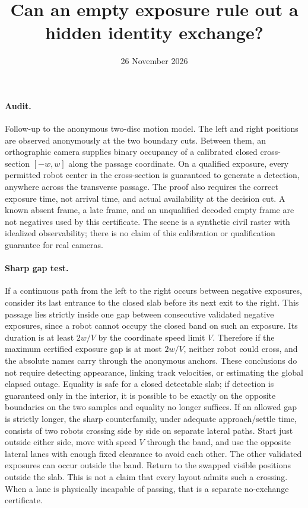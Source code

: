 \documentclass{article}
\title{Can an empty exposure rule out a hidden identity exchange?}
\author{}
\date{26 November 2026}
\begin{document}
\maketitle

\paragraph{Audit.}
Follow-up to the anonymous two-disc motion model. The left and right
positions are observed anonymously at the two boundary cuts. Between
them, an orthographic camera supplies binary occupancy of a calibrated
closed cross-section $[-w,w]$ along the passage coordinate. On a qualified
exposure, every permitted robot center in the cross-section is guaranteed
to generate a detection, anywhere across the transverse passage.
The proof also requires the correct exposure time, not arrival time,
and actual availability at the decision cut. A known absent frame,
a late frame, and an unqualified decoded empty frame are not negatives
used by this certificate. The scene is a synthetic civil raster with
idealized observability; there is no claim of this calibration or
qualification guarantee for real cameras.

\paragraph{Sharp gap test.}
If a continuous path from the left to the right occurs between negative
exposures, consider its last entrance to the closed slab before its
next exit to the right. This passage lies strictly inside one gap
between consecutive validated negative exposures, since a robot
cannot occupy the closed band on such an exposure. Its duration is
at least $2w/V$ by the coordinate speed limit $V$. Therefore if the
maximum certified exposure gap is at most $2w/V$, neither robot could
cross, and the absolute names carry through the anonymous anchors.
These conclusions do not require detecting appearance, linking track
velocities, or estimating the global elapsed outage. Equality is safe
for a closed detectable slab; if detection is guaranteed only in the
interior, it is possible to be exactly on the opposite boundaries
on the two samples and equality no longer suffices.
If an allowed gap is strictly longer, the sharp counterfamily, under
adequate approach/settle time, consists of two robots crossing side by
side on separate lateral paths. Start just outside either side, move
with speed $V$ through the band, and use the opposite lateral lanes
with enough fixed clearance to avoid each other. The other validated
exposures can occur outside the band. Return to the swapped visible
positions outside the slab. This is not a claim that every layout
admits such a crossing. When a lane is physically incapable of passing,
that is a separate no-exchange certificate.
\end{document}
